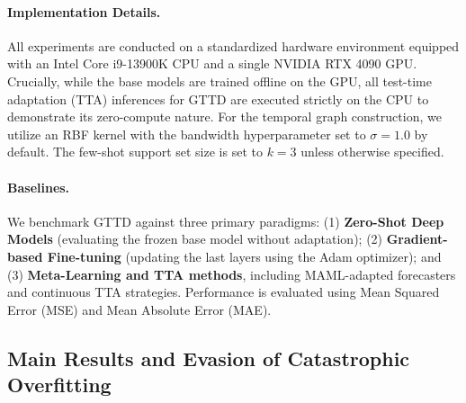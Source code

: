 \documentclass{article}
\begin{document}
\paragraph{Implementation Details.} All experiments are conducted on a standardized hardware environment equipped with an Intel Core i9-13900K CPU and a single NVIDIA RTX 4090 GPU. Crucially, while the base models are trained offline on the GPU, all test-time adaptation (TTA) inferences for GTTD are executed strictly on the CPU to demonstrate its zero-compute nature. For the temporal graph construction, we utilize an RBF kernel with the bandwidth hyperparameter set to $\sigma = 1.0$ by default. The few-shot support set size is set to $k=3$ unless otherwise specified.

\paragraph{Baselines.} We benchmark GTTD against three primary paradigms: (1) \textbf{Zero-Shot Deep Models} (evaluating the frozen base model without adaptation); (2) \textbf{Gradient-based Fine-tuning} (updating the last layers using the Adam optimizer); and (3) \textbf{Meta-Learning and TTA methods}, including MAML-adapted forecasters and continuous TTA strategies. Performance is evaluated using Mean Squared Error (MSE) and Mean Absolute Error (MAE).

\subsection{Main Results and Evasion of Catastrophic Overfitting}

	
\end{document}
